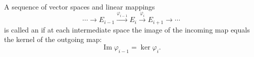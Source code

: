 A sequence of vector spaces and linear mappings
$$
\cdots \longrightarrow E_{i-1} \xrightarrow{\varphi_{i-1}} E_i \xrightarrow{\varphi_i} E_{i+1} \longrightarrow \cdots
$$
is called an  if at each intermediate space the image of the incoming map equals the kernel of the outgoing map:
$$
\operatorname{Im} \varphi_{i-1} = \ker \varphi_i.
$$
